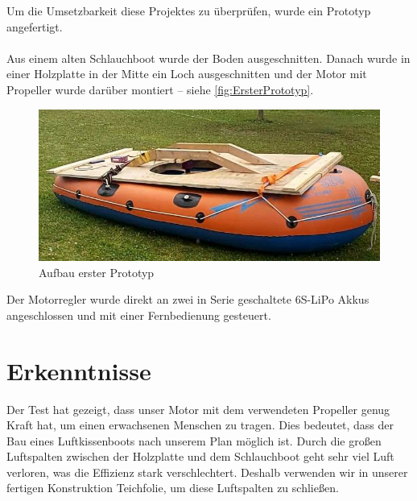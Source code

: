 Um die Umsetzbarkeit diese Projektes zu überprüfen, wurde ein Prototyp angefertigt.\\
\\
Aus einem alten Schlauchboot wurde der Boden ausgeschnitten. Danach wurde in einer Holzplatte in der Mitte ein Loch ausgeschnitten und der Motor mit Propeller wurde darüber montiert -- siehe \autoref{fig:ErsterPrototyp}.
\begin{figure}[h!]
  \centering
  \includegraphics[width=.95\textwidth]{./Aufbau1.jpg}
  \caption{Aufbau erster Prototyp}
  \label{fig:ErsterPrototyp}
\end{figure}

Der Motorregler wurde direkt an zwei in Serie geschaltete 6S-LiPo Akkus angeschlossen und mit einer Fernbedienung gesteuert.
\section*{Erkenntnisse}
Der Test hat gezeigt, dass unser Motor mit dem verwendeten Propeller genug Kraft hat, um einen erwachsenen Menschen zu tragen. Dies bedeutet, dass der Bau eines Luftkissenboots nach unserem Plan möglich ist. Durch die großen Luftspalten zwischen der Holzplatte und dem Schlauchboot geht sehr viel Luft verloren, was die Effizienz stark verschlechtert. Deshalb verwenden wir in unserer fertigen Konstruktion Teichfolie, um diese Luftspalten zu schließen. 
